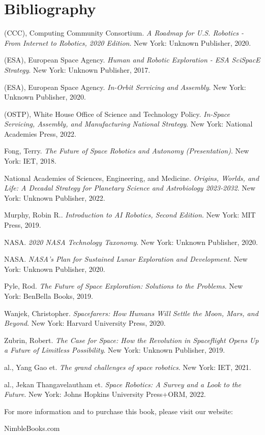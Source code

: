 \chapter*{Bibliography}

\begin{hangparas}{0.15in}{1}
\setlength{\parskip}{6pt}

(CCC), Computing Community Consortium. \t\textit{A Roadmap for U.S. Robotics - From Internet to Robotics, 2020 Edition}. New York: Unknown Publisher, 2020.

(ESA), European Space Agency. \t\textit{Human and Robotic Exploration - ESA SciSpacE Strategy}. New York: Unknown Publisher, 2017.

(ESA), European Space Agency. \t\textit{In-Orbit Servicing and Assembly}. New York: Unknown Publisher, 2020.

(OSTP), White House Office of Science and Technology Policy. \t\textit{In-Space Servicing, Assembly, and Manufacturing National Strategy}. New York: National Academies Press, 2022.

Fong, Terry. \t\textit{The Future of Space Robotics and Autonomy (Presentation)}. New York: IET, 2018.

National Academies of Sciences, Engineering, and Medicine. \t\textit{Origins, Worlds, and Life: A Decadal Strategy for Planetary Science and Astrobiology 2023-2032}. New York: Unknown Publisher, 2022.

Murphy, Robin R.. \t\textit{Introduction to AI Robotics, Second Edition}. New York: MIT Press, 2019.

NASA. \t\textit{2020 NASA Technology Taxonomy}. New York: Unknown Publisher, 2020.

NASA. \t\textit{NASA's Plan for Sustained Lunar Exploration and Development}. New York: Unknown Publisher, 2020.

Pyle, Rod. \t\textit{The Future of Space Exploration: Solutions to the Problems}. New York: BenBella Books, 2019.

Wanjek, Christopher. \t\textit{Spacefarers: How Humans Will Settle the Moon, Mars, and Beyond}. New York: Harvard University Press, 2020.

Zubrin, Robert. \t\textit{The Case for Space: How the Revolution in Spaceflight Opens Up a Future of Limitless Possibility}. New York: Unknown Publisher, 2019.

al., Yang Gao et. \t\textit{The grand challenges of space robotics}. New York: IET, 2021.

al., Jekan Thangavelautham et. \t\textit{Space Robotics: A Survey and a Look to the Future}. New York: Johns Hopkins University Press+ORM, 2022.

\end{hangparas}

\cleardoublepage

\vfill
\begin{center}
For more information and to purchase this book, please visit our website:
\par\vspace{1em}
NimbleBooks.com
\end{center}
\cleardoublepage

